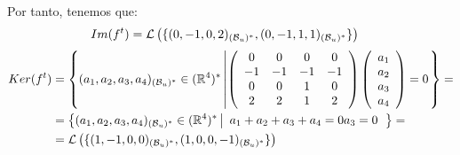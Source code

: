\documentclass[12pt]{article}
\begin{document}
\begin{ejercicio}
\begin{enumerate}
        Por tanto, tenemos que:
        \begin{equation*}\begin{split}
            Im(f^t)&=\mathcal{L}\left(\{(0,-1,0,2)_{(\mathcal{B}_u)^\ast}, (0,-1,1,1)_{(\mathcal{B}_u)^\ast}\}\right)
        \end{split}\end{equation*}
        \begin{equation*}\begin{split}
            Ker(f^t)&=\left\{(a_1,a_2,a_3,a_4)_{(\mathcal{B}_u)^\ast}\in (\mathbb{R}^4)^\ast \left|\left(\begin{array}{cccc}
                0 & 0 & 0 & 0 \\
                -1 & -1 & -1 & -1 \\
                0 & 0 & 1 & 0 \\
                2 & 2 & 1 & 2 \\
            \end{array}\right)\left(\begin{array}{c}
                a_1\\a_2\\a_3\\a_4
            \end{array}\right)=0\right.\right\}=\\
            &=\left\{(a_1,a_2,a_3,a_4)_{(\mathcal{B}_u)^\ast}\in (\mathbb{R}^4)^\ast \left|\begin{array}{c}
                a_1+a_2+a_3+a_4=0
                a_3=0
            \end{array}\right.\right\} =\\
            &=\mathcal{L}\left(\{(1,-1,0,0)_{(\mathcal{B}_u)^\ast}, (1,0,0,-1)_{(\mathcal{B}_u)^\ast}\}\right)
        \end{split}\end{equation*}
        
    \end{enumerate}
\end{ejercicio}
\end{document}
